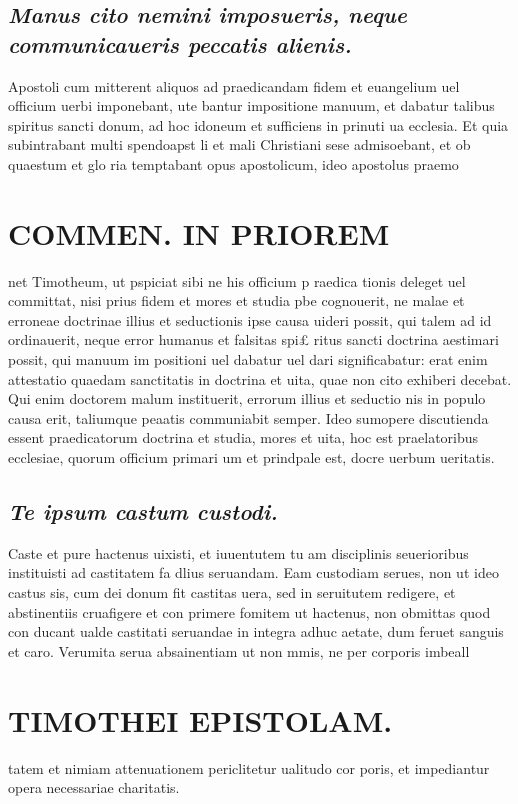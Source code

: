 \documentclass{article}
\begin{document}
\begin{pages}
\subsection*{\textit{Manus cito nemini imposueris, neque  communicaueris peccatis alienis. }}\pstart Apostoli cum mitterent aliquos ad praedicandam fidem et euangelium uel officium uerbi imponebant, ute bantur impositione manuum, et dabatur talibus spiritus sancti donum, ad hoc idoneum et sufficiens in prinuti ua ecclesia. Et quia subintrabant multi spendoapst li et mali Christiani sese admisoebant, et ob quaestum et glo ria temptabant opus apostolicum, ideo apostolus praemo  \pend
\section*{COMMEN. IN PRIOREM }
\marginpar{[ p.148 ]}\pstart net Timotheum, ut pspiciat sibi ne his officium p raedica tionis deleget uel committat, nisi prius fidem et mores et studia pbe cognouerit, ne malae et erroneae doctrinae illius et seductionis ipse causa uideri possit, qui talem ad id ordinauerit, neque error humanus et falsitas spi£ ritus sancti doctrina aestimari possit, qui manuum im positioni uel dabatur uel dari significabatur: erat enim attestatio quaedam sanctitatis in doctrina et uita, quae non cito exhiberi decebat. Qui enim doctorem malum instituerit, errorum illius et seductio nis in populo causa erit, taliumque peaatis communiabit semper. Ideo sumopere discutienda essent praedicatorum doctrina et studia, mores et uita, hoc est praelatoribus ecclesiae, quorum officium primari um et prindpale est, docre uerbum ueritatis.  \pend
{}
{}
\subsection*{\textit{Te ipsum castum custodi. }}\pstart Caste et pure hactenus uixisti, et iuuentutem tu am disciplinis seuerioribus instituisti ad castitatem fa dlius seruandam. Eam custodiam serues, non ut ideo castus sis, cum dei donum fit castitas uera, sed in seruitutem redigere, et abstinentiis cruafigere et con primere fomitem ut hactenus, non obmittas quod con ducant ualde castitati seruandae in integra adhuc aetate, dum feruet sanguis et caro. Verumita serua absainentiam ut non mmis, ne per corporis imbeall  \pend
\section*{TIMOTHEI EPISTOLAM. }
\marginpar{[ p.149 ]}\pstart tatem et nimiam attenuationem periclitetur ualitudo cor poris, et impediantur opera necessariae charitatis.  \pend
{}
{}

\end{pages}
\end{document}
